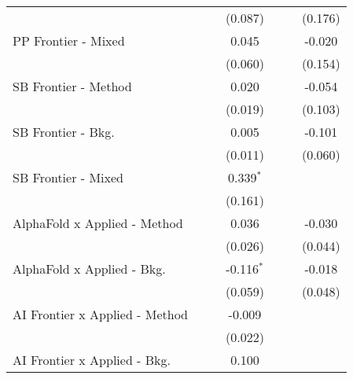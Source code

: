 \begin{tabular}{lcccccc}
                                  &                &                & (0.087)        &                &              & (0.176)\\   
   PP Frontier - Mixed            &                &                & 0.045          &                &              & -0.020\\   
                                  &                &                & (0.060)        &                &              & (0.154)\\   
   SB Frontier - Method           &                &                & 0.020          &                &              & -0.054\\   
                                  &                &                & (0.019)        &                &              & (0.103)\\   
   SB Frontier - Bkg.             &                &                & 0.005          &                &              & -0.101\\   
                                  &                &                & (0.011)        &                &              & (0.060)\\   
   SB Frontier - Mixed            &                &                & 0.339$^{*}$    &                &              &   \\   
                                  &                &                & (0.161)        &                &              &   \\   
   AlphaFold x Applied - Method   &                &                & 0.036          &                &              & -0.030\\   
                                  &                &                & (0.026)        &                &              & (0.044)\\   
   AlphaFold x Applied - Bkg.     &                &                & -0.116$^{*}$   &                &              & -0.018\\   
                                  &                &                & (0.059)        &                &              & (0.048)\\   
   AI Frontier x Applied - Method &                &                & -0.009         &                &              &   \\   
                                  &                &                & (0.022)        &                &              &   \\   
   AI Frontier x Applied - Bkg.   &                &                & 0.100          &                &              &   \\   

\end{tabular}
